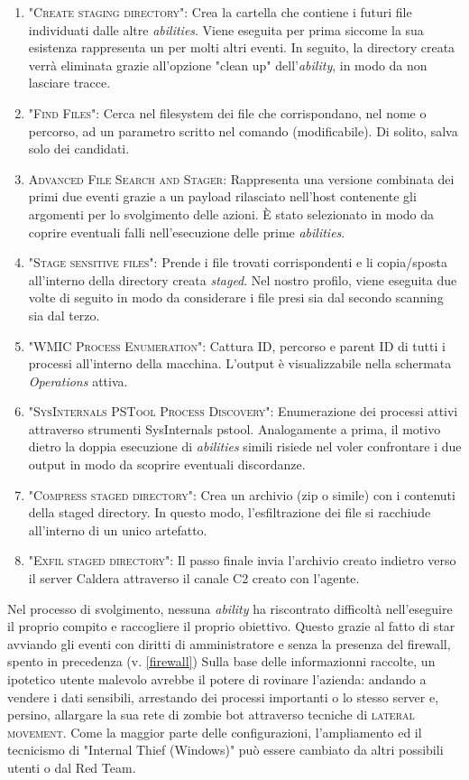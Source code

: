     \begin{enumerate}
        \item \textsc{"Create staging directory"}: Crea la cartella che contiene i futuri file individuati dalle altre \textit{abilities}. Viene eseguita per prima siccome la sua esistenza rappresenta un  per molti altri eventi. In seguito, la directory creata verrà eliminata grazie all'opzione "clean up" dell'\textit{ability}, in modo da non lasciare tracce.
        \item \textsc{"Find Files"}: Cerca nel filesystem dei file che corrispondano, nel nome o percorso, ad un parametro scritto nel comando (modificabile). Di solito, salva solo dei candidati.
        \item \textsc{Advanced File Search and Stager}: Rappresenta una versione combinata dei primi due eventi grazie a un payload rilasciato nell'host contenente gli argomenti per lo svolgimento delle azioni. È stato selezionato in modo da coprire eventuali falli nell'esecuzione delle prime \textit{abilities}.
        \item \textsc{"Stage sensitive files"}: Prende i file trovati corrispondenti e li copia/sposta all'interno della directory creata \textit{staged}. Nel nostro profilo, viene eseguita due volte di seguito in modo da considerare i file presi sia dal secondo scanning sia dal terzo.
        \item \textsc{"WMIC Process Enumeration"}: Cattura ID, percorso e parent ID di tutti i processi all'interno della macchina. L'output è visualizzabile nella schermata \textit{Operations} attiva.
        \item \textsc{"SysInternals PSTool Process Discovery"}: Enumerazione dei processi attivi attraverso strumenti SysInternals pstool. Analogamente a prima, il motivo dietro la doppia esecuzione di \textit{abilities} simili risiede nel voler confrontare i due output in modo da scoprire eventuali discordanze.
        \item \textsc{"Compress staged directory"}: Crea un archivio (zip o simile) con i contenuti della staged directory. In questo modo, l'esfiltrazione dei file si racchiude all'interno di un unico artefatto.
        \item \textsc{"Exfil staged directory"}: Il passo finale invia l'archivio creato indietro verso il server Caldera attraverso il canale C2 creato con l'agente.
    \end{enumerate}
    Nel processo di svolgimento, nessuna \textit{ability} ha riscontrato difficoltà nell'eseguire il proprio compito e raccogliere il proprio obiettivo. Questo grazie al fatto di star avviando gli eventi con diritti di amministratore e senza la presenza del firewall, spento in precedenza (v. \ref{firewall})
    Sulla base delle informazionni raccolte, un ipotetico utente malevolo avrebbe il potere di rovinare l'azienda: andando a vendere i dati sensibili, arrestando dei processi importanti o lo stesso server e, persino, allargare la sua rete di zombie bot attraverso tecniche di \textsc{lateral movement}. Come la maggior parte delle configurazioni, l'ampliamento ed il tecnicismo di "Internal Thief (Windows)" può essere cambiato da altri possibili utenti o dal Red Team.
    